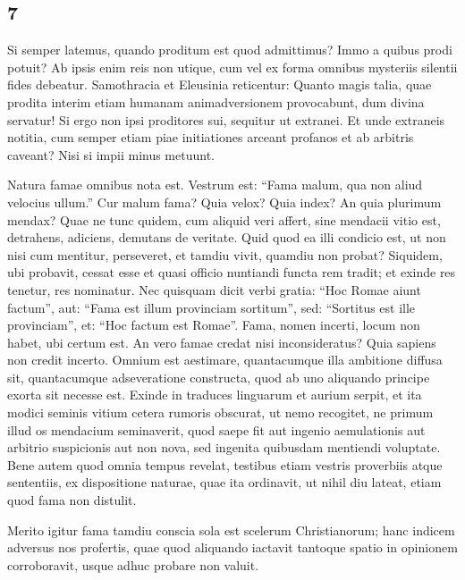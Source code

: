 \subsection*{7}

Si semper latemus, quando proditum est quod admittimus? Immo a quibus prodi potuit? Ab ipsis enim reis non utique, cum vel ex forma omnibus mysteriis silentii fides debeatur. Samothracia et Eleusinia reticentur: Quanto magis talia, quae prodita interim etiam humanam animadversionem provocabunt, dum divina servatur! Si ergo non ipsi proditores sui, sequitur ut extranei. Et unde extraneis notitia, cum semper etiam piae initiationes arceant profanos et ab arbitris caveant? Nisi si impii minus metuunt.

Natura famae omnibus nota est. Vestrum est: ``Fama malum, qua non aliud velocius ullum.'' Cur malum fama? Quia velox? Quia index? An quia plurimum mendax? Quae ne tunc quidem, cum aliquid veri affert, sine mendacii vitio est, detrahens, adiciens, demutans de veritate. Quid quod ea illi condicio est, ut non nisi cum mentitur, perseveret, et tamdiu vivit, quamdiu non probat? Siquidem, ubi probavit, cessat esse et quasi officio nuntiandi functa rem tradit; et exinde res tenetur, res nominatur. Nec quisquam dicit verbi gratia: ``Hoc Romae aiunt factum'', aut: ``Fama est illum provinciam sortitum'', sed: ``Sortitus est ille provinciam'', et: ``Hoc factum est Romae''. Fama, nomen incerti, locum non habet, ubi certum est. An vero famae credat nisi inconsideratus? Quia sapiens non credit incerto. Omnium est aestimare, quantacumque illa ambitione diffusa sit, quantacumque adseveratione constructa, quod ab uno aliquando principe exorta sit necesse est. Exinde in traduces linguarum et aurium serpit, et ita modici seminis vitium cetera rumoris obscurat, ut nemo recogitet, ne primum illud os mendacium seminaverit, quod saepe fit aut ingenio aemulationis aut arbitrio suspicionis aut non nova, sed ingenita quibusdam mentiendi voluptate. Bene autem quod omnia tempus revelat, testibus etiam vestris proverbiis atque sententiis, ex dispositione naturae, quae ita ordinavit, ut nihil diu lateat, etiam quod fama non distulit.

Merito igitur fama tamdiu conscia sola est scelerum Christianorum; hanc indicem adversus nos profertis, quae quod aliquando iactavit tantoque spatio in opinionem corroboravit, usque adhuc probare non valuit.

